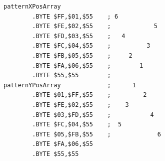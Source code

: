 \begin{lstlisting}[caption=Source code for the Batalyx\index{Batalyx} pattern..,escapechar=\%]
patternXPosArray             
        .BYTE $FF,$01,$55    ; 6              
        .BYTE $FE,$02,$55    ;            5   
        .BYTE $FD,$03,$55    ;   4            
        .BYTE $FC,$04,$55    ;          3     
        .BYTE $FB,$05,$55    ;     2          
        .BYTE $FA,$06,$55    ;        1       
        .BYTE $55,$55        ;                
patternYPosArray             ;      1         
        .BYTE $01,$FF,$55    ;         2      
        .BYTE $FE,$02,$55    ;    3           
        .BYTE $03,$FD,$55    ;           4    
        .BYTE $FC,$04,$55    ;  5             
        .BYTE $05,$FB,$55    ;             6 
        .BYTE $FA,$06,$55
        .BYTE $55,$55
\end{lstlisting}




